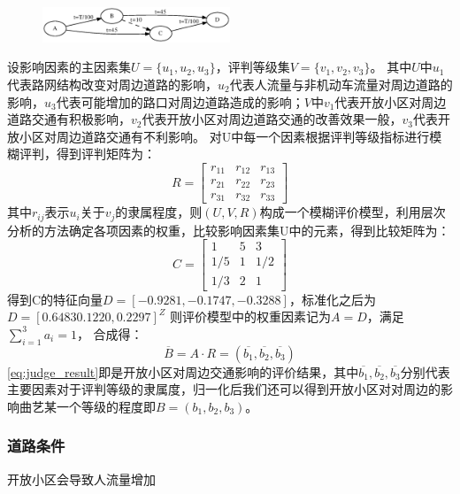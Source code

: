 \documentclass[fontset=windows,a4paper,12pt]{ctexart}
\begin{document}
			\begin{figure}
				\centering
				\includegraphics[width=0.5\textwidth]{pic/braess.eps}
			\end{figure}
			设影响因素的主因素集$ U=\{u_1,u_2,u_3\} $，评判等级集$ V=\{v_1,v_2,v_3\} $。
			其中$ U $中$ u_1 $代表路网结构改变对周边道路的影响，$ u_2 $代表人流量与非机动车流量对周边道路的影响，$ u_3 $代表可能增加的路口对周边道路造成的影响；$ V $中$ v_1 $代表开放小区对周边道路交通有积极影响，$ v_2 $代表开放小区对周边道路交通的改善效果一般，$ v_3 $代表开放小区对周边道路交通有不利影响。
			对U中每一个因素根据评判等级指标进行模糊评判，得到评判矩阵为：
			$$
				R=\left[
				\begin{array}{cccc}
					r_{11} & r_{12} & r_{13}\\
					r_{21} & r_{22} & r_{23}\\
					r_{31} & r_{32} & r_{33}
				\end{array}
				\right]
			$$
			其中$ r_{ij} $表示$ u_i $关于$ v_j $的隶属程度，则$ (U,V,R) $构成一个模糊评价模型，利用层次分析的方法确定各项因素的权重，比较影响因素集U中的元素，得到比较矩阵为：
			$$
				C=\left[
				\begin{array}{cccc}
					1 & 5 & 3\\
					1/5 & 1 & 1/2\\
					1/3 & 2 & 1
				\end{array}
				\right]
			$$
			得到C的特征向量$ D=[-0.9281,-0.1747,-0.3288] $，标准化之后为$ D=[0.6483 0.1220,0.2297]^Z $
			则评价模型中的权重因素记为$ A=D $，满足$ \sum_{i=1}^{3}a_i=1 $，
			合成得：
			\begin{equation}
				\overline{B}=A \cdot R=(\overline{b_1},\overline{b_2},\overline{b_3}) 
				\label{eq:judge_result}
			\end{equation}
			\ref{eq:judge_result}即是开放小区对周边交通影响的评价结果，其中$\overline{b_1},\overline{b_2},\overline{b_3}$分别代表主要因素对于评判等级的隶属度，归一化后我们还可以得到开放小区对对周边的影响曲艺某一个等级的程度即$ B=(b_1,b_2,b_3) $。
		\subsubsection{道路条件}
			开放小区会导致人流量增加
\end{document}
